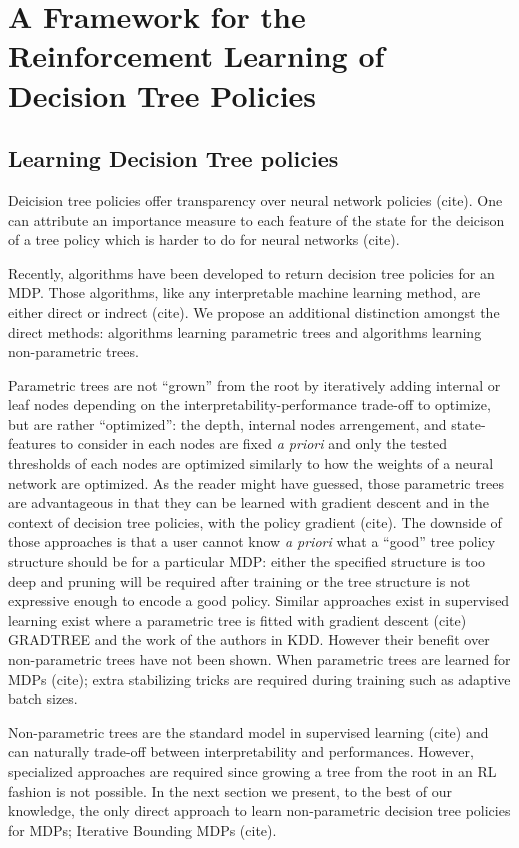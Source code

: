 \chapter{A Framework for the Reinforcement Learning of Decision Tree Policies}
\section{Learning Decision Tree policies}
Deicision tree policies offer transparency over neural network policies (cite). 
One can attribute an importance measure to each feature of the state for the deicison of a tree policy which is harder to do for neural networks (cite).

Recently, algorithms have been developed to return decision tree policies for an MDP.
Those algorithms, like any interpretable machine learning method, are either direct or indrect (cite).
We propose an additional distinction amongst the direct methods: algorithms learning parametric trees and algorithms learning non-parametric trees.

Parametric trees are not ``grown'' from the root by iteratively adding internal or leaf nodes depending on the interpretability-performance trade-off to optimize, but are rather ``optimized'': the depth, internal nodes arrengement, and state-features to consider in each nodes are fixed \textit{a priori} and only the tested thresholds of each nodes are optimized similarly to how the weights of a neural network are optimized.
As the reader might have guessed, those parametric trees are advantageous in that they can be learned with gradient descent and in the context of decision tree policies, with the policy gradient (cite).
The downside of those approaches is that a user cannot know \textit{a priori}  what a ``good'' tree policy structure should be for a particular MDP: either the specified structure is too deep and pruning will be required after training or the tree structure is not expressive enough to encode a good policy. 
Similar approaches exist in supervised learning exist where a parametric tree is fitted with gradient descent (cite) GRADTREE and the work of the authors in KDD. However their benefit over non-parametric trees have not been shown.
When parametric trees are learned for MDPs (cite); extra stabilizing tricks are required during training such as adaptive batch sizes.

Non-parametric trees are the standard model in supervised learning (cite) and can naturally trade-off between interpretability and performances. However, specialized approaches are required since growing a tree from the root in an RL fashion is not possible.
In the next section we present, to the best of our knowledge, the only direct approach to learn non-parametric decision tree policies for MDPs; Iterative Bounding MDPs (cite). 

